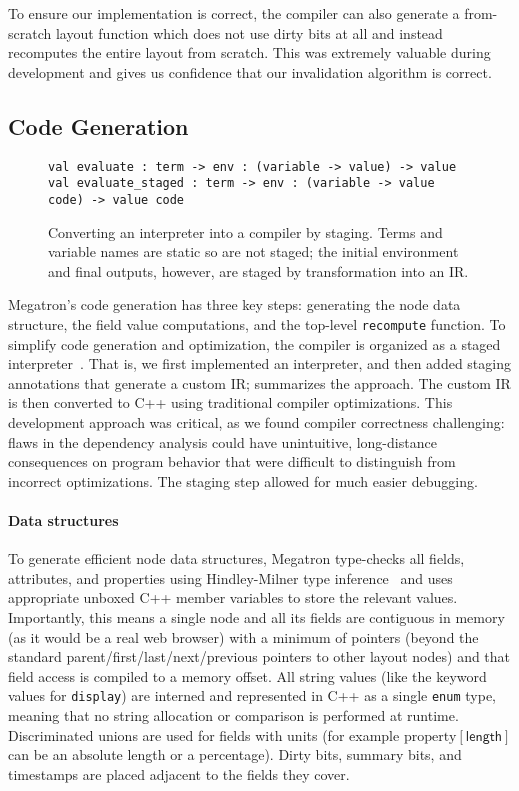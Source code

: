 To ensure our implementation is correct,
  the compiler can also generate a from-scratch layout function
  which does not use dirty bits at all
  and instead recomputes the entire layout from scratch.
This was extremely valuable during development
  and gives us confidence that our invalidation algorithm is correct.

\subsection{Code Generation}

\begin{figure}[bt]
\begin{verbatim}
val evaluate : term -> env : (variable -> value) -> value
val evaluate_staged : term -> env : (variable -> value code) -> value code
\end{verbatim}
\caption{
  Converting an interpreter into a compiler by staging.
  Terms and variable names are static so are not staged;
    the initial environment and final outputs, however,
    are staged by transformation into an IR.}
\label{fig:stage}
\end{figure}

Megatron's code generation has three key steps:
  generating the node data structure,
  the field value computations,
  and the top-level \texttt{recompute} function.
To simplify code generation and optimization,
  the compiler is organized as a staged interpreter~\cite{MetaOCaml}.
That is, we first implemented an interpreter,
  and then added staging annotations that generate a custom IR;
   summarizes the approach.
The custom IR is then converted to C++
  using traditional compiler optimizations.
This development approach was critical,
  as we found compiler correctness challenging:
  flaws in the dependency analysis could have unintuitive,
  long-distance consequences on program behavior
  that were difficult to distinguish from incorrect optimizations.
The staging step allowed for much easier debugging.

\paragraph{Data structures}
To generate efficient node data structures,
  Megatron type-checks all fields, attributes, and properties
  using Hindley-Milner type inference~\cite{HM}
  and uses appropriate unboxed C++ member variables
  to store the relevant values.
Importantly, this means a single node and all its fields
  are contiguous in memory
  (as it would be a real web browser)
  with a minimum of pointers
  (beyond the standard parent/first/last/next/previous pointers
  to other layout nodes)
  and that field access is compiled to a memory offset.
All string values (like the keyword values for \texttt{display})
  are interned and represented in C++ as
  a single \texttt{enum} type,
  meaning that no string allocation or comparison
  is performed at runtime.
Discriminated unions are used for fields with units
  (for example $\text{property}[\mathsf{length}]$
    can be an absolute length or a percentage).
Dirty bits, summary bits, and timestamps
  are placed adjacent to the fields they cover.

